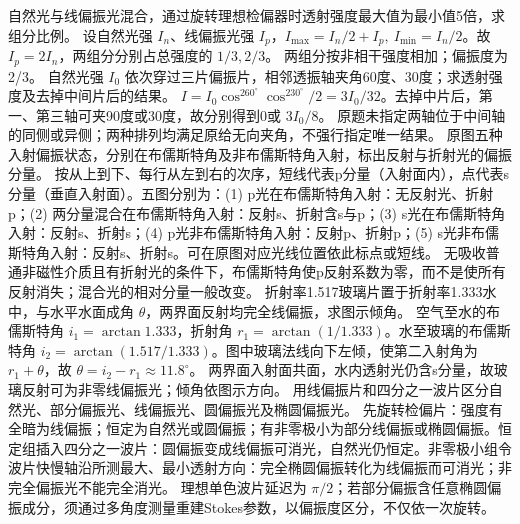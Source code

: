 \problemtext 自然光与线偏振光混合，通过旋转理想检偏器时透射强度最大值为最小值5倍，求组分比例。
\workings 设自然光强 $I_n$、线偏振光强 $I_p$，$I_{\max}=I_n/2+I_p,\ I_{\min}=I_n/2$。故 $I_p=2I_n$，两组分分别占总强度的 $1/3,2/3$。
\crosscheck 两组分按非相干强度相加；偏振度为2/3。
\problemtext 自然光强 $I_0$ 依次穿过三片偏振片，相邻透振轴夹角60度、30度；求透射强度及去掉中间片后的结果。
\workings $I=I_0\cos^260^\circ\cos^230^\circ/2=3I_0/32$。去掉中片后，第一、第三轴可夹90度或30度，故分别得到0或 $3I_0/8$。
\crosscheck 原题未指定两轴位于中间轴的同侧或异侧；两种排列均满足原给无向夹角，不强行指定唯一结果。
\problemtext 原图五种入射偏振状态，分别在布儒斯特角及非布儒斯特角入射，标出反射与折射光的偏振分量。
\workings 按从上到下、每行从左到右的次序，短线代表p分量（入射面内），点代表s分量（垂直入射面）。五图分别为：(1) p光在布儒斯特角入射：无反射光、折射p；(2) 两分量混合在布儒斯特角入射：反射s、折射含s与p；(3) s光在布儒斯特角入射：反射s、折射s；(4) p光非布儒斯特角入射：反射p、折射p；(5) s光非布儒斯特角入射：反射s、折射s。可在原图对应光线位置依此标点或短线。
\crosscheck 无吸收普通非磁性介质且有折射光的条件下，布儒斯特角使p反射系数为零，而不是使所有反射消失；混合光的相对分量一般改变。
\problemtext 折射率1.517玻璃片置于折射率1.333水中，与水平水面成角 $\theta$，两界面反射均完全线偏振，求图示倾角。
\workings 空气至水的布儒斯特角 $i_1=\arctan1.333$，折射角 $r_1=\arctan(1/1.333)$。水至玻璃的布儒斯特角 $i_2=\arctan(1.517/1.333)$。图中玻璃法线向下左倾，使第二入射角为 $r_1+\theta$，故 $\theta=i_2-r_1\approx11.8^\circ$。
\crosscheck 两界面入射面共面，水内透射光仍含s分量，故玻璃反射可为非零线偏振光；倾角依图示方向。
\problemtext 用线偏振片和四分之一波片区分自然光、部分偏振光、线偏振光、圆偏振光及椭圆偏振光。
\workings 先旋转检偏片：强度有全暗为线偏振；恒定为自然光或圆偏振；有非零极小为部分线偏振或椭圆偏振。恒定组插入四分之一波片：圆偏振变成线偏振可消光，自然光仍恒定。非零极小组令波片快慢轴沿所测最大、最小透射方向：完全椭圆偏振转化为线偏振而可消光；非完全偏振光不能完全消光。
\crosscheck 理想单色波片延迟为 $\pi/2$；若部分偏振含任意椭圆偏振成分，须通过多角度测量重建Stokes参数，以偏振度区分，不仅依一次旋转。
